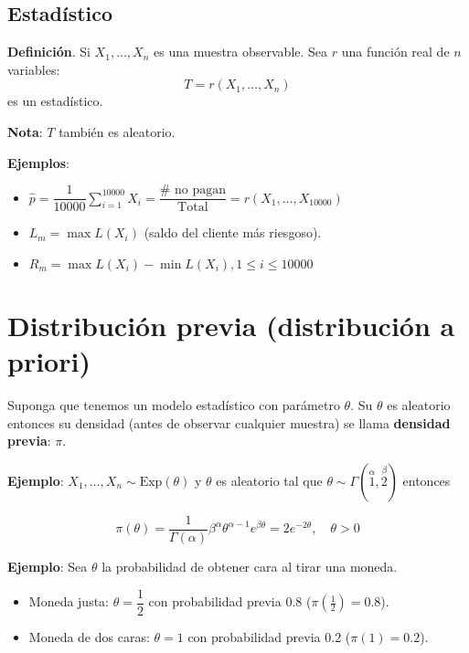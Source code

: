 \documentclass[
  12pt,
]{book}
\begin{document}
\hypertarget{estaduxedstico}{%
\section{Estadístico}\label{estaduxedstico}}

\textbf{Definición}. Si \(X_1,\dots,X_n\) es una muestra observable. Sea \(r\) una función real de \(n\) variables:
\begin{equation*}
T = r(X_1,\dots,X_n)
\end{equation*}
es un estadístico.

\textbf{Nota}: \(T\) también es aleatorio.

\textbf{Ejemplos}:

\begin{itemize}
\item
  \(\hat p = \dfrac{1}{10000}\displaystyle\sum_{i=1}^{10000}X_i = \dfrac{\#\text{ no pagan}}{\text{Total}} = r(X_1,\dots,X_{10000})\)
\item
  \(L_m = \max L(X_i)\) (saldo del cliente más riesgoso).
\item
  \(R_m = \max L(X_i) - \min L(X_i), 1\leq i\leq 10000\)
\end{itemize}

\hypertarget{distribuciuxf3n-previa-distribuciuxf3n-a-priori}{%
\chapter{Distribución previa (distribución a priori)}\label{distribuciuxf3n-previa-distribuciuxf3n-a-priori}}

Suponga que tenemos un modelo estadístico con parámetro \(\theta\). Su \(\theta\) es aleatorio entonces su densidad (antes de observar cualquier muestra) se llama \textbf{densidad previa}: \(\pi\).

\textbf{Ejemplo}: \(X_1,\dots, X_n \sim \text{Exp}(\theta)\) y \(\theta\) es aleatorio tal que \(\theta \sim \Gamma(\stackrel{\alpha}{1},\stackrel{\beta}{2})\) entonces

\[ \pi(\theta) = \dfrac{1}{\Gamma(\alpha)}\beta^\alpha\theta^{\alpha-1}e^{\beta\theta} = 2e^{-2\theta}, \quad \theta > 0\]

\textbf{Ejemplo}: Sea \(\theta\) la probabilidad de obtener cara al tirar una moneda.

\begin{itemize}
\item
  Moneda justa: \(\theta = \dfrac{1}{2}\) con probabilidad previa \(0.8\) (\(\pi(\frac{1}{2}) = 0.8\)).
\item
  Moneda de dos caras: \(\theta = 1\) con probabilidad previa \(0.2\) (\(\pi(1) = 0.2\)).
\end{itemize}
\end{document}
